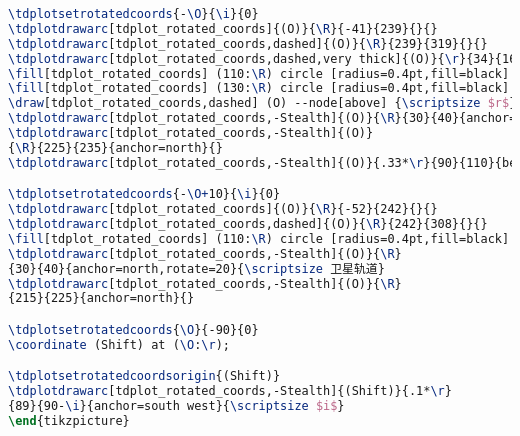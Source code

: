 \documentclass[list,answers,csize4,custom]{sysuexam}
\begin{document}
\begin{groups}
\begin{questions}[rs]
\begin{lstlisting}[title=题六1代码,language=tex,basicstyle={\ttfamily\footnotesize}]
\tdplotsetrotatedcoords{-\O}{\i}{0}
\tdplotdrawarc[tdplot_rotated_coords]{(O)}{\R}{-41}{239}{}{}
\tdplotdrawarc[tdplot_rotated_coords,dashed]{(O)}{\R}{239}{319}{}{}
\tdplotdrawarc[tdplot_rotated_coords,dashed,very thick]{(O)}{\r}{34}{164}{}{}
\fill[tdplot_rotated_coords] (110:\R) circle [radius=0.4pt,fill=black] node[below right,inner sep=1pt]{\scriptsize $S_0$};
\fill[tdplot_rotated_coords] (130:\R) circle [radius=0.4pt,fill=black] node[below right,inner sep=1pt]{\scriptsize $S_1$};
\draw[tdplot_rotated_coords,dashed] (O) --node[above] {\scriptsize $r$} (110:\R) ;
\tdplotdrawarc[tdplot_rotated_coords,-Stealth]{(O)}{\R}{30}{40}{anchor=north}{}
\tdplotdrawarc[tdplot_rotated_coords,-Stealth]{(O)}
{\R}{225}{235}{anchor=north}{}
\tdplotdrawarc[tdplot_rotated_coords,-Stealth]{(O)}{.33*\r}{90}{110}{below right,inner sep=1pt}{\scriptsize $\nu$}

\tdplotsetrotatedcoords{-\O+10}{\i}{0}
\tdplotdrawarc[tdplot_rotated_coords]{(O)}{\R}{-52}{242}{}{}
\tdplotdrawarc[tdplot_rotated_coords,dashed]{(O)}{\R}{242}{308}{}{}
\fill[tdplot_rotated_coords] (110:\R) circle [radius=0.4pt,fill=black] node[below right,inner sep=1pt]{\scriptsize $S_2$};
\tdplotdrawarc[tdplot_rotated_coords,-Stealth]{(O)}{\R}
{30}{40}{anchor=north,rotate=20}{\scriptsize 卫星轨道}
\tdplotdrawarc[tdplot_rotated_coords,-Stealth]{(O)}{\R}
{215}{225}{anchor=north}{}

\tdplotsetrotatedcoords{\O}{-90}{0}
\coordinate (Shift) at (\O:\r);

\tdplotsetrotatedcoordsorigin{(Shift)}
\tdplotdrawarc[tdplot_rotated_coords,-Stealth]{(Shift)}{.1*\r}
{89}{90-\i}{anchor=south west}{\scriptsize $i$}
\end{tikzpicture}
    \end{lstlisting}
    \begin{solution}
        \answers
        \begin{center}
\end{center}
\end{solution}
\end{questions}
\end{groups}
\end{document}

